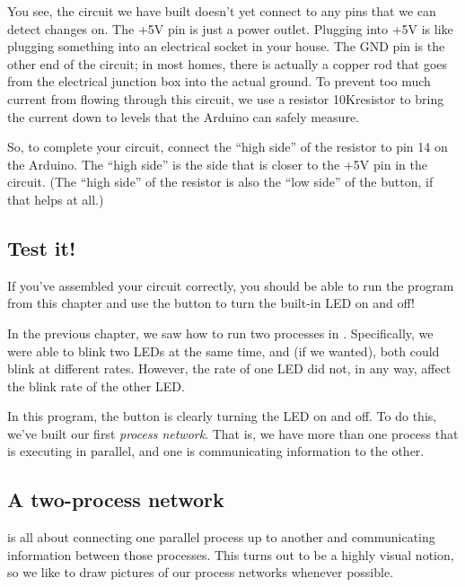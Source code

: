 You see, the circuit we have built doesn't yet connect to any pins that we can detect changes on. The {\code +5V} pin is just a power outlet. Plugging into {\code +5V} is like plugging something into an electrical socket in your house. The {\code GND} pin is the other end of the circuit; in most homes, there is actually a copper rod that goes from the electrical junction box into the actual ground. To prevent too much current from flowing through this circuit, we use a resistor 10K\ohm resistor to bring the current down to levels that the Arduino can safely measure.

So, to complete your circuit, connect the ``high side'' of the resistor to pin 14 on the Arduino. The ``high side'' is the side that is closer to the {\code +5V} pin in the circuit. (The ``high side'' of the resistor is also the ``low side'' of the button, if that helps at all.)

\subsection{Test it!}
If you've assembled your circuit correctly, you should be able to run the program from this chapter and use the button to turn the built-in LED on and off!

\PATTERNS
In the previous chapter, we saw how to run two processes in \PARallel. Specifically, we were able to blink two LEDs at the same time, and (if we wanted), both could blink at different rates. However, the rate of one LED did not, in any way, affect the blink rate of the other LED.

In this program, the button is clearly turning the LED on and off. To do this, we've built our first {\em process network}. That is, we have more than one process that is executing in parallel, and one is communicating information to the other.

\subsection{A two-process network}
\plumbing is all about connecting one parallel process up to another and communicating information between those processes. This turns out to be a highly visual notion, so we like to draw pictures of our process networks whenever possible.
 
